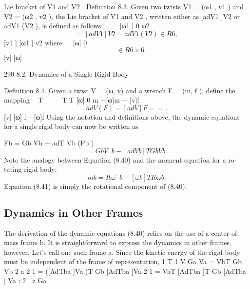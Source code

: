 \documentclass[12pt,a4paper]{article}
\begin{document}
Lie bracket of V1 and V2 .
Definition 8.3. Given two twists V1 = (ω1 , v1 ) and V2 = (ω2 , v2 ), the Lie
bracket of V1 and V2 , written either as [adV1 ]V2 or adV1 (V2 ), is defined as
follows:                      
               [ω1 ]  0       ω2
\begin{equation}
= [adV1 ]V2 = adV1 (V2 ) ∈ R6 ,
\label{eq:8.37}
\end{equation}
               [v1 ] [ω1 ]    v2
where                                                      
                                                [ω]    0
\begin{equation}
[adV ] =                       ∈ R6×6 .
\label{eq:8.38}
\end{equation}
                                                [v]   [ω]


290                                                      8.2. Dynamics of a Single Rigid Body

Definition 8.4. Given a twist V = (ω, v) and a wrench F = (m, f ), define the
mapping
                                  T                        
     T             T      [ω] 0          m        −[ω]m − [v]f
\begin{equation}
adV (F) = [adV ] F =                       =                   .
\label{eq:8.39}
\end{equation}
                          [v] [ω]        f           −[ω]f
    Using the notation and definitions above, the dynamic equations for a single
rigid body can now be written as

                                 Fb    = Gb V̇b − adT
                                                    Vb (Pb )
\begin{equation}
= Gb V̇b − [adVb ]T Gb Vb .
\label{eq:8.40}
\end{equation}
Note the analogy between Equation (8.40) and the moment equation for a ro-
tating rigid body:
\begin{equation}
mb = Ib ω̇b − [ωb ]T Ib ωb .
\label{eq:8.41}
\end{equation}
Equation (8.41) is simply the rotational component of (8.40).

\subsection{Dynamics in Other Frames}
The derivation of the dynamic equations (8.40) relies on the use of a center-of-
mass frame {b}. It is straightforward to express the dynamics in other frames,
however. Let’s call one such frame {a}.
    Since the kinetic energy of the rigid body must be independent of the frame
of representation,
                          1 T       1
                           V Ga Va = VbT Gb Vb
                          2 a       2
                                    1
                                   = ([AdTba ]Va )T Gb [AdTba ]Va
                                    2
                                    1
                                   = VaT [AdTba ]T Gb [AdTba ] Va ;
                                    2    |        {z        }
                                                            Ga
\end{document}
